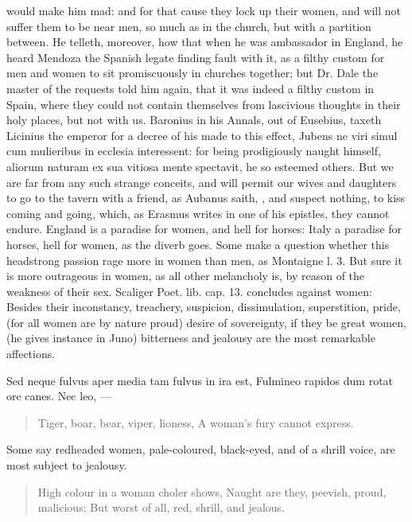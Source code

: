 would make him mad: and for that cause they lock up their women, and
will not suffer them to be near men, so much as in the church,
but with a partition between. He telleth, moreover, how that when he
was ambassador in England, he heard Mendoza the Spanish legate finding
fault with it, as a filthy custom for men and women to sit
promiscuously in churches together; but Dr. Dale the master of the
requests told him again, that it was indeed a filthy custom in Spain,
where they could not contain themselves from lascivious thoughts in
their holy places, but not with us. Baronius in his Annals, out of
Eusebius, taxeth Licinius the emperor for a decree of his made to this
effect, Jubens ne viri simul cum mulieribus in ecclesia interessent:
for being prodigiously naught himself, aliorum naturam ex sua vitiosa
mente spectavit, he so esteemed others. But we are far from any such
strange conceits, and will permit our wives and daughters to go to the
tavern with a friend, as Aubanus saith, , and
suspect nothing, to kiss coming and going, which, as Erasmus writes in
one of his epistles, they cannot endure. England is a paradise for
women, and hell for horses: Italy a paradise for horses, hell for
women, as the diverb goes. Some make a question whether this headstrong
passion rage more in women than men, as Montaigne l. 3. But sure it is
more outrageous in women, as all other melancholy is, by reason of the
weakness of their sex. Scaliger Poet. lib. cap. 13. concludes against
women: Besides their inconstancy, treachery, suspicion,
dissimulation, superstition, pride, (for all women are by nature proud)
desire of sovereignty, if they be great women, (he gives instance in
Juno) bitterness and jealousy are the most remarkable affections.

\begin{latin}
Sed neque fulvus aper media tam fulvus in ira est,
Fulmineo rapidos dum rotat ore canes.
Nec leo, \etc{}---
\end{latin}

\begin{verse}%
Tiger, boar, bear, viper, lioness,
A woman's fury cannot express.
\end{verse}%

Some say redheaded women, pale-coloured, black-eyed, and of a
shrill voice, are most subject to jealousy.
%
\begin{verse}%
High colour in a woman choler shows,
Naught are they, peevish, proud, malicious;
But worst of all, red, shrill, and jealous.
\end{verse}%
%

